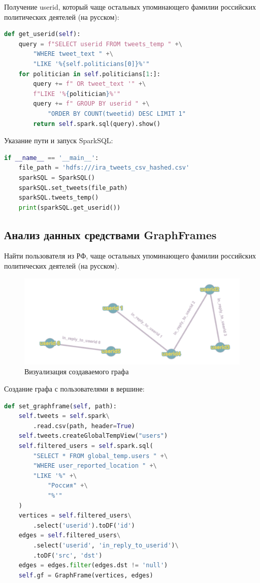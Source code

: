 Получение userid, который чаще остальных упоминающего фамилии российских политических деятелей (на русском):

\begin{lstlisting}[language={Python}, caption={Получение userid}, label=lst:sql3]
def get_userid(self):
	query = f"SELECT userid FROM tweets_temp " +\
		"WHERE tweet_text " +\
		"LIKE '%{self.politicians[0]}%'"
	for politician in self.politicians[1:]:
		query += f" OR tweet_text '" +\
		f"LIKE '%{politician}%'"
		query += f" GROUP BY userid " +\
			"ORDER BY COUNT(tweetid) DESC LIMIT 1"
		return self.spark.sql(query).show()
\end{lstlisting}

Указание пути и запуск SparkSQL:

\begin{lstlisting}[language={Python}, caption={Запуск SparkSQL}, label=lst:sql4]
if __name__ == '__main__':
	file_path = 'hdfs:///ira_tweets_csv_hashed.csv'
	sparkSQL = SparkSQL()
	sparkSQL.set_tweets(file_path)
	sparkSQL.tweets_temp()
	print(sparkSQL.get_userid())
\end{lstlisting}

\subsection{Анализ данных средствами GraphFrames}

Найти пользователя из РФ, чаще остальных упоминающего фамилии российских политических деятелей (на русском).

\begin{figure}[htb]
	\centering
	\includegraphics[width=.9\textwidth]{graph.png}
	\parskip=6pt
	\caption{Визуализация создаваемого графа}
	\label{fig:gfpic}
\end{figure}

Создание графа с пользователями в вершине:

\begin{lstlisting}[language={Python}, caption={Создание графа}, label=lst:gf1]
def set_graphframe(self, path):
	self.tweets = self.spark\
		.read.csv(path, header=True)
	self.tweets.createGlobalTempView("users")
	self.filtered_users = self.spark.sql(
		"SELECT * FROM global_temp.users " +\
		"WHERE user_reported_location " +\
		"LIKE '%" +\
			"Россия" +\
			"%'"
	)
	vertices = self.filtered_users\
		.select('userid').toDF('id')
	edges = self.filtered_users\
		.select('userid', 'in_reply_to_userid')\
		.toDF('src', 'dst')
	edges = edges.filter(edges.dst != 'null')
	self.gf = GraphFrame(vertices, edges)
\end{lstlisting}


